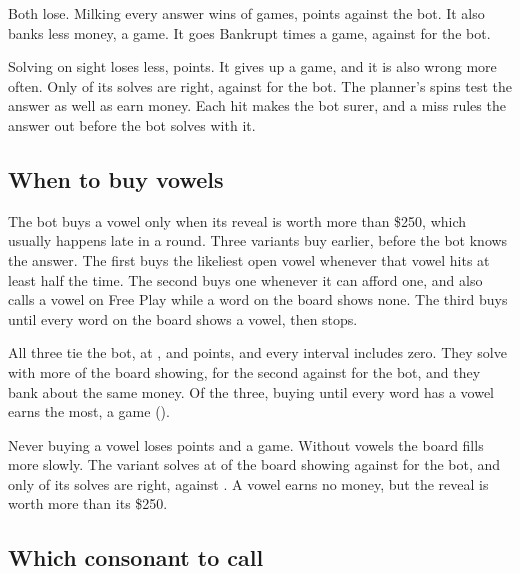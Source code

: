 Both lose. Milking every answer wins \VariantMilkWin{} of games, \VariantMilkVsBoth{} points against the bot. It also banks less money, \VariantMilkMainVsBoth{} a game. It goes Bankrupt \VariantMilkBankrupts{} times a game, against \VariantMilkBaseBankrupts{} for the bot.

Solving on sight loses less, \VariantSolveVsBoth{} points. It gives up \VariantSolveMainVsBoth{} a game, and it is also wrong more often. Only \VariantSolveAcc{} of its solves are right, against \VariantSolveBaseAcc{} for the bot. The planner's spins test the answer as well as earn money. Each hit makes the bot surer, and a miss rules the answer out before the bot solves with it.

\subsection{When to buy vowels}

The bot buys a vowel only when its reveal is worth more than \$250, which usually happens late in a round. Three variants buy earlier, before the bot knows the answer. The first buys the likeliest open vowel whenever that vowel hits at least half the time. The second buys one whenever it can afford one, and also calls a vowel on Free Play while a word on the board shows none. The third buys until every word on the board shows a vowel, then stops.

All three tie the bot, at \VariantVowelsVsBoth, \VariantAffordVsBoth{} and \VariantCoverVsBoth{} points, and every interval includes zero. They solve with more of the board showing, \VariantAffordShown{} for the second against \VariantAffordBaseShown{} for the bot, and they bank about the same money. Of the three, buying until every word has a vowel earns the most, \VariantCoverMainVsBoth{} a game (\VariantCoverMainVsBothCI).

Never buying a vowel loses \VariantNoVowelVsBoth{} points and \VariantNoVowelMainVsBoth{} a game. Without vowels the board fills more slowly. The variant solves at \VariantNoVowelShown{} of the board showing against \VariantNoVowelBaseShown{} for the bot, and only \VariantNoVowelAcc{} of its solves are right, against \VariantNoVowelBaseAcc. A vowel earns no money, but the reveal is worth more than its \$250.

\subsection{Which consonant to call}

